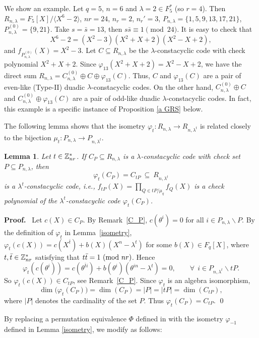 \documentclass{article}
\newtheorem{Lemma}[Theorem]{Lemma}
\numberwithin{equation}{section}
\numberwithin{table}{section}
\def\Z{{\Bbb Z}}
\def\pf{\par{\bf Proof.}~ }
\def\M{{\varphi}} \def\N{{\psi}} \def\m{{\mu}}
\begin{document}
We show an example.
Let $q=5$, $n=6$ and $\lambda=2\in F_5^*$ (so $r=4$). Then
$R_{n,\lambda}=F_5[X]/\langle X^6-2\rangle$, $nr=24$, $n_r=2$, $n_r'=3$,
$P_{n,\lambda}=\{1,5,9,13,17,21\}$, 
$P_{n,\lambda}^{(0)}=\{9,21\}$. 
Take $s=\bar s=13$, then $s\bar s\equiv 1\!\pmod{24}$.
It is easy to check that
$$
X^6-2=(X^2-3)(X^2+X+2)(X^2-X+2),
$$
and $f_{P_{n,\lambda}^{(0)}}(X)=X^2-3$.
Let $C\subseteq R_{n,\lambda}$ be the $\lambda$-constacyclic 
code with check polynomial $X^2+X+2$. 
Since  $\M_{13}(X^2+X+2)=X^2-X+2$, we have the direct sum
$R_{n,\lambda}=C_{n,\lambda}^{(0)}\oplus C\oplus \M_{13}(C)$.
Thus, $C$ and $\M_{13}(C)$ are a pair of 
even-like (Type-II) duadic $\lambda$-constacyclic codes.
On the other hand,
$C_{n,\lambda}^{(0)}\oplus C$ and 
$C_{n,\lambda}^{(0)}\oplus \M_{13}(C)$ are a pair of 
odd-like duadic $\lambda$-constacyclic codes.
In fact, this example is a specific instance of Proposition \ref{a GRS} below. 


\smallskip
The following lemma shows that the isometry
$\M_t: R_{n,\lambda}\to R_{n,\lambda^t}$
is related closely to the bijection
$\mu_{t}: P_{n,\lambda}\to P_{n,\lambda^t}$.

\begin{Lemma}\label{bar t P} Let $t\in\Z_{nr}^*$.
If  $C_P\subseteq R_{n,\lambda}$ is a $\lambda$-constacyclic code
with check set $P\subseteq P_{n,\lambda}$,
then
\begin{equation*}
 \M_t(C_P)=C_{tP}~\subseteq~ R_{n,\lambda^t}
\end{equation*}
is a $\lambda^t$-constacyclic code,
i.e., $f_{tP}(X)=\prod_{Q\in tP/\mu_q}f_Q(X)$
is a check polynomial of the $\lambda^{t}$-constacyclic code $\M_t(C_P)$.
\end{Lemma}

\pf Let $c(X)\in C_{P}$. By Remark~\ref{C_P}, $c(\theta^i)=0$
for all $i\in P_{n,\lambda}\backslash{P}$.
By the definition of $\M_t$ in Lemma~\ref{isometry},
$\M _t(c(X))=c(X^{\bar t})+b(X)(X^n-\lambda^t)$ for some $b(X)\in F_q[X]$,
where $t,\bar t\in\Z_{nr}^*$ satisfying that $t\bar t=1~({\rm mod}~nr)$.
Hence
$$
\M _t(c(\theta^i))=c(\theta^{\bar t i})+b(\theta^i)(\theta^{in}-\lambda^t)=0,
\qquad \forall~~i\in {P_{n,\lambda^t}}\backslash{tP}.
$$
So $\M _t(c(X))\in C_{tP}$, see Remark~\ref{C_P}. Since $\M_t$ is an algebra isomorphism,
$$\dim\big(\M_t(C_P)\big)=\dim(C_P)=|P|=|tP|=\dim(C_{tP}),$$
where $|P|$ denotes the cardinality of the set $P$. Thus $\M_t(C_P)=C_{tP}$.
\qed

\medskip
By replacing a permutation equivalence $\Phi$ defined in \cite{Bl13}
with the isometry $\M_{-1}$ defined in Lemma \ref{isometry},
we modify \cite[Th.4]{Bl13} as follows: 
\end{document}
